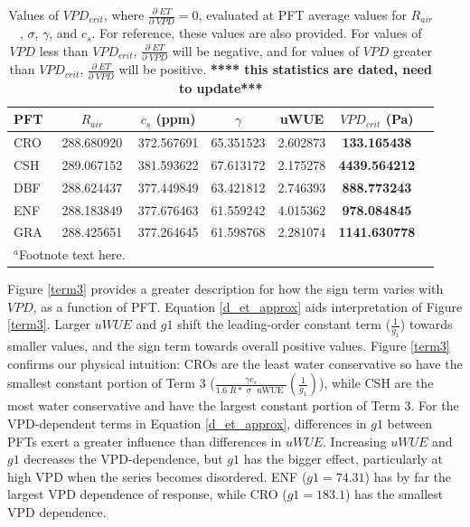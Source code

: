 \documentclass[draft,linenumbers]{agujournal}
\begin{document}
\begin{table}
  \label{vpd_crit}
\caption{Values of $VPD_{crit}$, where $\frac{\partial \; ET}{\partial \; VPD} = 0$, evaluated at PFT average values for $R_{air}$, $\sigma$, $\gamma$, and $c_s$. For reference, these values are also provided. For values of $VPD$ less than $VPD_{crit}$, $\frac{\partial \; ET}{\partial \; VPD}$ will be negative, and for values of $VPD$ greater than $VPD_{crit}$, $\frac{\partial \; ET}{\partial \; VPD}$ will be positive. \textbf{**** this statistics are dated, need to update***}}
\centering
\begin{tabular}{l c c c c c c}
  \hline
  PFT & $R_{air}$ & $c_s$ (ppm) & $\gamma$ &  uWUE    & \textbf{$VPD_{crit}$ (Pa)} \\
  \hline
  CRO &  288.680920 & 372.567691& 65.351523& 2.602873&  \textbf{133.165438} \\
  CSH &   289.067152& 381.593622& 67.613172& 2.175278& \textbf{4439.564212} \\
  DBF &   288.624437& 377.449849& 63.421812& 2.746393&  \textbf{888.773243} \\
  ENF &  288.183849& 377.676463& 61.559242& 4.015362&  \textbf{978.084845} \\
  GRA &  288.425651& 377.264645& 61.598768& 2.281074& \textbf{1141.630778} \\
\hline
\multicolumn{2}{l}{$^{a}$Footnote text here.}
\end{tabular}
\end{table}

Figure \ref{term3} provides a greater description for how the sign term varies with $VPD$, as a function of PFT. Equation \ref{d_et_approx} aids interpretation of Figure \ref{term3}. Larger $uWUE$ and $g1$ shift the leading-order constant term ($\frac{1}{g_1}$) towards smaller values, and the sign term towards overall positive values. %
Figure \ref{term3} confirms our physical intuition: CROs are the least water conservative so have the smallest constant portion of Term 3 ($\frac{\gamma c_s }{1.6 \; R*\; \sigma \; \text{ uWUE }} \left(\frac{1}{g_1}\right)$), while CSH are the most water conservative and have the largest constant portion of Term 3. For the VPD-dependent terms in Equation \ref{d_et_approx}, differences in $g1$ between PFTs exert a greater influence than differences in $uWUE$. Increasing $uWUE$ and $g1$ decreases the VPD-dependence, but $g1$ has the bigger effect, particularly at high VPD when the series becomes disordered. ENF ($g1 = 74.31$) has by far the largest VPD dependence of response, while CRO ($g1 = 183.1$) has the smallest VPD dependence.
\end{document}
